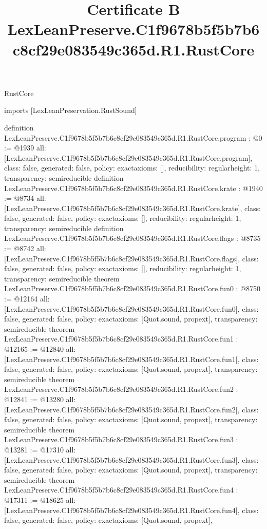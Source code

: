 \begin{lexlean}{RustCore}
\title{Certificate B LexLeanPreserve.C1f9678b5f5b7b6c8cf29e083549c365d.R1.RustCore}
\begin{coremodule}
imports [LexLeanPreservation.RustSound]

definition LexLeanPreserve.C1f9678b5f5b7b6c8cf29e083549c365d.R1.RustCore.program : @0 := @1939 {
  all: [LexLeanPreserve.C1f9678b5f5b7b6c8cf29e083549c365d.R1.RustCore.program],
  class: false,
  generated: false,
  policy: exact{axioms: []},
  reducibility: regular{height: 1},
  transparency: semireducible
}
definition LexLeanPreserve.C1f9678b5f5b7b6c8cf29e083549c365d.R1.RustCore.krate : @1940 := @8734 {
  all: [LexLeanPreserve.C1f9678b5f5b7b6c8cf29e083549c365d.R1.RustCore.krate],
  class: false,
  generated: false,
  policy: exact{axioms: []},
  reducibility: regular{height: 1},
  transparency: semireducible
}
definition LexLeanPreserve.C1f9678b5f5b7b6c8cf29e083549c365d.R1.RustCore.flags : @8735 := @8742 {
  all: [LexLeanPreserve.C1f9678b5f5b7b6c8cf29e083549c365d.R1.RustCore.flags],
  class: false,
  generated: false,
  policy: exact{axioms: []},
  reducibility: regular{height: 1},
  transparency: semireducible
}
theorem LexLeanPreserve.C1f9678b5f5b7b6c8cf29e083549c365d.R1.RustCore.fun0 : @8750 := @12164 {
  all: [LexLeanPreserve.C1f9678b5f5b7b6c8cf29e083549c365d.R1.RustCore.fun0],
  class: false,
  generated: false,
  policy: exact{axioms: [Quot.sound, propext]},
  transparency: semireducible
}
theorem LexLeanPreserve.C1f9678b5f5b7b6c8cf29e083549c365d.R1.RustCore.fun1 : @12165 := @12840 {
  all: [LexLeanPreserve.C1f9678b5f5b7b6c8cf29e083549c365d.R1.RustCore.fun1],
  class: false,
  generated: false,
  policy: exact{axioms: [Quot.sound, propext]},
  transparency: semireducible
}
theorem LexLeanPreserve.C1f9678b5f5b7b6c8cf29e083549c365d.R1.RustCore.fun2 : @12841 := @13280 {
  all: [LexLeanPreserve.C1f9678b5f5b7b6c8cf29e083549c365d.R1.RustCore.fun2],
  class: false,
  generated: false,
  policy: exact{axioms: [Quot.sound, propext]},
  transparency: semireducible
}
theorem LexLeanPreserve.C1f9678b5f5b7b6c8cf29e083549c365d.R1.RustCore.fun3 : @13281 := @17310 {
  all: [LexLeanPreserve.C1f9678b5f5b7b6c8cf29e083549c365d.R1.RustCore.fun3],
  class: false,
  generated: false,
  policy: exact{axioms: [Quot.sound, propext]},
  transparency: semireducible
}
theorem LexLeanPreserve.C1f9678b5f5b7b6c8cf29e083549c365d.R1.RustCore.fun4 : @17311 := @18625 {
  all: [LexLeanPreserve.C1f9678b5f5b7b6c8cf29e083549c365d.R1.RustCore.fun4],
  class: false,
  generated: false,
  policy: exact{axioms: [Quot.sound, propext]},
}
\end{coremodule}
\end{lexlean}
